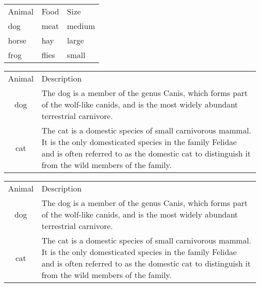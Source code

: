 \documentclass{article}
\begin{document}
\begin{tabular}{lll}
  Animal & Food  & Size   \\
  dog    & meat  & medium \\
  horse  & hay   & large  \\
  frog   & flies & small  \\
\end{tabular}

\newpage

\begin{tabular}{cl}
  Animal & Description \\
  dog    & The dog is a member of the genus Canis, which forms part of the
           wolf-like canids, and is the most widely abundant terrestrial
           carnivore. \\
  cat    & The cat is a domestic species of small carnivorous mammal. It is the
           only domesticated species in the family Felidae and is often referred
           to as the domestic cat to distinguish it from the wild members of the
           family. \\
\end{tabular}



\newpage
\begin{tabular}{cp{9cm}}

  Animal & Description \\
  dog    & The dog is a member of the genus Canis, which forms part of the
           wolf-like canids, and is the most widely abundant terrestrial
           carnivore. \\
  cat    & The cat is a domestic species of small carnivorous mammal. It is the
           only domesticated species in the family Felidae and is often referred
           to as the domestic cat to distinguish it from the wild members of the
           family. \\
\end{tabular}


\newpage

\end{document}
